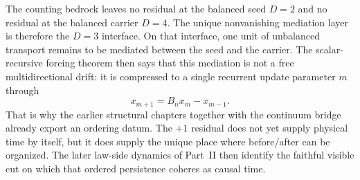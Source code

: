 \begin{remark}[Why the \(D=3\) residual already carries order]
\label{rem:d3-residual-carries-order}
The counting bedrock leaves no residual at the balanced seed \(D=2\) and no
residual at the balanced carrier \(D=4\). The unique nonvanishing mediation
layer is therefore the \(D=3\) interface. On that interface, one unit of
unbalanced transport remains to be mediated between the seed and the carrier.
The scalar-recursive forcing theorem then says that this mediation is not a
free multidirectional drift: it is compressed to a single recurrent update
parameter \(m\) through
\[
x_{m+1}=B_nx_m-x_{m-1}.
\]
That is why the earlier structural chapters together with the continuum bridge
already export an ordering datum. The \(+1\) residual
does not yet supply physical time by itself, but it does supply the unique
place where before/after can be organized. The later law-side dynamics of
Part~II then identify the faithful visible cut on which that ordered
persistence coheres as causal time.
\end{remark}

